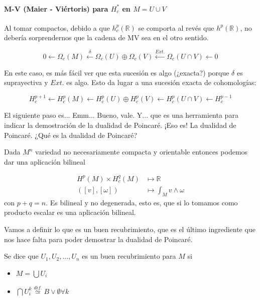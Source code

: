 \documentclass[palatino, bibnumbers]{apuntes}
\begin{document}
\paragraph{M-V (Maier - Viértoris) para $H^\ast_c$ en $M=U\cup V$}

Al tomar compactos, debido a que $h^p_c(ℝ)$ se comporta al revés que $h^p(ℝ)$, no debería sorprendernos que la cadena de MV sea en el otro sentido.

\[
	0 \leftarrow Ω_c(M) \overset{δ}{\leftarrow} Ω_c(U) \oplus Ω_c(V) \overset{Ext.}{\leftarrow} Ω_c(U\cap V) \leftarrow 0
\]

En este caso, es más fácil ver que esta sucesión es algo (¿exacta?) porque $δ$ es suprayectiva y $Ext.$ es algo.
Esto da lugar a una sucesión exacta de cohomologías:

\[
	H_c^{p+1} \leftarrow H_c^p(M) \leftarrow H_c^p(U) \oplus H_c^p(V) \leftarrow H_c^p(U\cap V) \leftarrow H_c^{p-1}
\]


El siguiente paso es... Emm... Bueno, vale. Y... que es una herramienta para indicar la demostración de la dualidad de Poincaré. ¡Eso es! La dualidad de Poincaré. ¿Qué es la dualidad de Poincaré?

\begin{lemma}


 Dada $M^n$ variedad no necesariamente compacta y orientable entonces podemos dar una aplicación bilineal

 \begin{align*}
	H^p(M) × H_c^q(M) &\longmapsto ℝ \\
	([v],[ω]) & \longmapsto \int_M v ∧ ω
\end{align*}
con $p + q = n$.
Es bilineal y no degenerada, esto es, que si lo tomamos como producto escalar es una aplicación bilineal.
\end{lemma}

Vamos a definir lo que es un buen recubrimiento, que es el último ingrediente que nos hace falta para poder demostrar la dualidad de Poincaré.

\begin{defn}
Se dice que $U_1,U_2,...,U_n$ es un buen recubrimiento para $M$ si 

\begin{itemize}
 	\item $ M =\bigcup U_i$
 	\item $\bigcap U_i^k \overset{dif.}{\simeq} B \vee \emptyset ∀k$
 \end{itemize} 
\end{defn}
\end{document}
